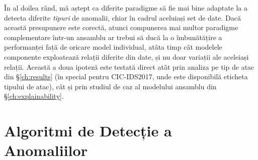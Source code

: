 În al doilea rând, mă aștept ca diferite paradigme să fie mai bine adaptate la a detecta diferite \emph{tipuri} de anomalii, chiar în cadrul aceluiași set de date. Dacă această presupunere este corectă, atunci compunerea mai multor paradigme complementare într-un ansamblu ar trebui să ducă la o îmbunătățire a performanței față de oricare model individual, atâta timp cât modelele componente exploatează relații diferite din date, și nu doar variații ale aceleiași relații. Această a doua ipoteză este testată direct atât prin analiza pe tip de atac din \S\ref{ch:results} (în special pentru CIC-IDS2017, unde este disponibilă eticheta tipului de atac), cât și prin studiul de caz al modelului ansamblu din \S\ref{ch:explainability}.



\section{Algoritmi de Detecție a Anomaliilor}
\label{sec:paradigms}

